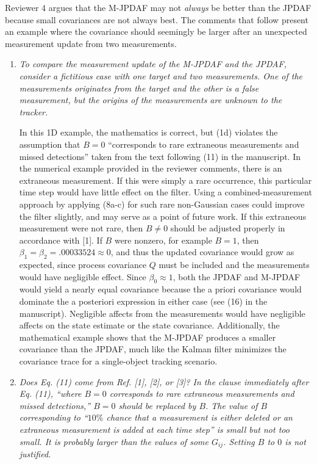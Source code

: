 \documentclass[11pt]{article}
\begin{document}
\begin{itemize}
Reviewer 4 argues that the M-JPDAF may not \emph{always} be better than the JPDAF because small covariances are not always best. The comments that follow present an example where the covariance should seemingly be larger after an unexpected measurement update from two measurements.

\begin{enumerate}


\item {\itshape To compare the measurement update of the M-JPDAF and the JPDAF, consider a fictitious case with one target and two measurements. One of the measurements originates from the target and the other is a false measurement, but the origins of the measurements are unknown to the tracker.}



In this 1D example, the mathematics is correct, but (1d) violates the assumption that $B=0$ ``corresponds to rare extraneous measurements and missed detections'' taken from the text following (11) in the manuscript. In the numerical example provided in the reviewer comments, there is an extraneous measurement. If this were simply a rare occurrence, this particular time step would have little effect on the filter. Using a combined-measurement approach by applying (8a-c) for such rare non-Gaussian cases could improve the filter slightly, and may serve as a point of future work.
If this extraneous measurement were not rare, then $B\neq0$ should be adjusted properly in accordance with [1].
If $B$ were nonzero, for example $B=1$, then $\beta_1=\beta_2=.00033524\approx0$, and thus the updated covariance would grow as expected, since process covariance $Q$ must be included and the measurements would have negligible effect. Since $\beta_0\approx1$, both the JPDAF and M-JPDAF would yield a nearly equal covariance because the a priori covariance would dominate the a posteriori expression in either case (see (16) in the manuscript). Negligible affects from the measurements would have negligible affects on the state estimate or the state covariance.
Additionally, the mathematical example shows that the M-JPDAF produces a smaller covariance than the JPDAF, much like the Kalman filter minimizes the covariance trace for a single-object tracking scenario.




\item {\itshape Does Eq. (11) come from Ref. [1], [2], or [3]? In the clause immediately after Eq. (11), ``where $B = 0$ corresponds to rare extraneous measurements and missed detections,'' $B = 0$ should be replaced by $B$. The value of $B$ corresponding to ``$10\%$ chance that a measurement is either deleted or an extraneous measurement is added at each time step'' is small but not too small. It is probably larger than the values of some $G_{ij}$. Setting $B$ to $0$ is not justified.}


\end{enumerate}
\end{itemize}
\end{document}
